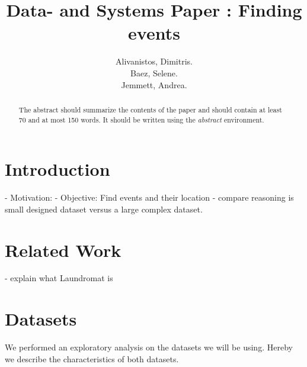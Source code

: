 \documentclass[runningheads,a4paper]{../../StyleFiles/llncs}
\begin{document}
\mainmatter  %

\title{Data- and Systems Paper : Finding events}


%
%
\author{Alivanistos, Dimitris. \\ Baez, Selene. \\ Jemmett, Andrea. }
%


\maketitle


\begin{abstract}
The abstract should summarize the contents of the paper and should
contain at least 70 and at most 150 words. It should be written using the
\emph{abstract} environment.
\end{abstract}


\section{Introduction}
- Motivation: 
- Objective: Find events and their location
- compare reasoning is small designed dataset versus a large complex dataset. 

\section{Related Work}
- explain what Laundromat is

\section{Datasets}
We performed an exploratory analysis on the datasets we will be using. Hereby we describe the characteristics of both datasets. 
\end{document}
